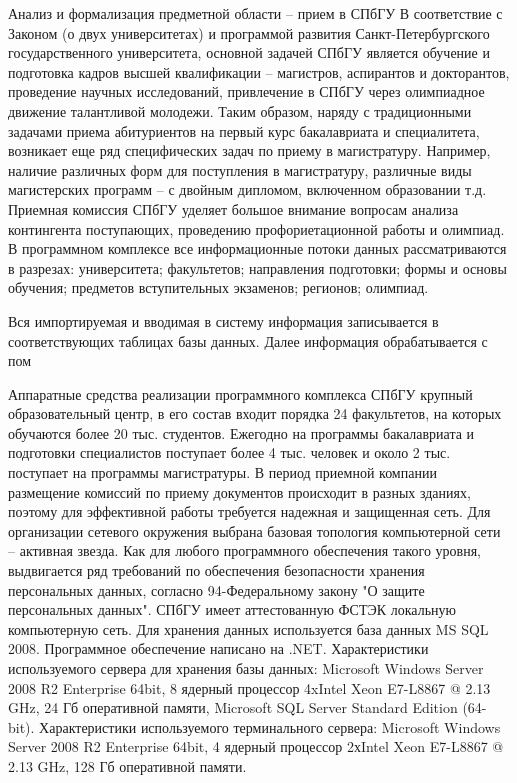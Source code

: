 \documentclass[12pt]{article}
\begin{document}
    Анализ и формализация предметной области  -- прием в СПбГУ
    В соответствие с Законом (о двух университетах) и программой развития Санкт-Петербургского государственного университета, основной задачей СПбГУ является обучение и подготовка кадров высшей квалификации – магистров, аспирантов и докторантов, проведение научных исследований, привлечение в СПбГУ через олимпиадное движение талантливой молодежи. Таким образом, наряду с традиционными задачами приема абитуриентов на первый курс бакалавриата и специалитета, возникает еще ряд специфических задач по приему в магистратуру. Например, наличие различных форм для поступления в магистратуру, различные виды магистерских программ – с двойным дипломом, включенном образовании т.д. Приемная комиссия СПбГУ уделяет большое внимание вопросам анализа контингента поступающих, проведению профориетационной работы и олимпиад. В программном комплексе все информационные потоки данных рассматриваются в разрезах: 
    университета;
    факультетов;
    направления подготовки;
    формы и основы обучения;
    предметов вступительных экзаменов;
    регионов;
    олимпиад.

    Вся импортируемая и вводимая в систему информация записывается в соответствующих таблицах базы данных. Далее информация обрабатывается с пом

    Аппаратные средства реализации программного комплекса
              СПбГУ крупный образовательный центр, в его состав входит порядка 24 факультетов, на которых обучаются более 20 тыс. студентов. Ежегодно на программы бакалавриата и подготовки специалистов поступает более 4 тыс. человек и около 2 тыс. поступает на программы магистратуры. В период приемной компании размещение комиссий по приему документов происходит в разных зданиях, поэтому для эффективной работы требуется надежная и защищенная сеть. Для организации сетевого окружения выбрана базовая топология компьютерной сети – активная звезда. Как для любого программного обеспечения такого уровня, выдвигается ряд требований по обеспечения безопасности хранения персональных данных, согласно 94-Федеральному закону "О защите персональных данных". СПбГУ имеет аттестованную ФСТЭК локальную компьютерную сеть. Для хранения данных используется база данных MS SQL 2008. Программное обеспечение написано на .NET.
              Характеристики используемого сервера для хранения базы данных: Microsoft Windows Server 2008 R2 Enterprise 64bit, 8 ядерный процессор 4xIntel Xeon E7-L8867 @ 2.13 GHz, 24 Гб оперативной памяти, Microsoft SQL Server Standard Edition (64-bit).
              Характеристики используемого терминального сервера: Microsoft Windows Server 2008 R2 Enterprise 64bit, 4 ядерный процессор 2хIntel Xeon E7-L8867 @ 2.13 GHz, 128 Гб оперативной памяти.
\end{document}
